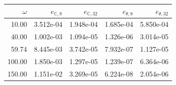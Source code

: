 \begin{tabular}{rrrrr}
\toprule
$\omega$ & $e_{\mathbb C,8}$ & $e_{\mathbb C,32}$ & $e_{\theta,8}$ & $e_{\theta,32}$\\
\midrule
10.00 & 3.512e-04 & 1.948e-04 & 1.685e-04 & 5.850e-04\\
40.00 & 1.002e-03 & 1.094e-05 & 1.326e-06 & 3.014e-05\\
59.74 & 8.445e-03 & 3.742e-05 & 7.932e-07 & 1.127e-05\\
100.00 & 1.850e-03 & 1.297e-05 & 1.239e-07 & 6.364e-06\\
150.00 & 1.151e-02 & 3.269e-05 & 6.224e-08 & 2.054e-06\\
\bottomrule
\end{tabular}

